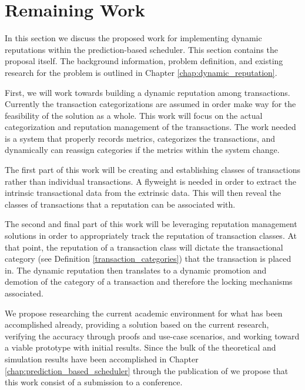 \section{Remaining Work}
\label{rep:remaining_work}

In this section we discuss the proposed work for implementing dynamic reputations within the prediction-based scheduler. This section contains the proposal itself. The background information, problem definition, and existing research for the problem is outlined in Chapter \ref{chap:dynamic_reputation}.

First, we will work towards building a dynamic reputation among transactions. Currently the transaction categorizations are assumed in order make way for the feasibility of the solution as a whole. This work will focus on the actual categorization and reputation management of the transactions. The work needed is a system that properly records metrics, categorizes the transactions, and dynamically can reassign categories if the metrics within the system change.

The first part of this work will be creating and establishing classes of transactions rather than individual transactions. A flyweight is needed in order to extract the intrinsic transactional data from the extrinsic data. This will then reveal the classes of transactions that a reputation can be associated with.

The second and final part of this work will be leveraging reputation management solutions in order to appropriately track the reputation of transaction classes. At that point, the reputation of a transaction class will dictate the transactional category (see Definition \ref{transaction_categories}) that the transaction is placed in. The dynamic reputation then translates to a dynamic promotion and demotion of the category of a transaction and therefore the locking mechanisms associated.

We propose researching the current academic environment for what has been accomplished already, providing a solution based on the current research, verifying the accuracy through proofs and use-case scenarios, and working toward a viable prototype with initial results. Since the bulk of the theoretical and simulation results have been accomplished in Chapter \ref{chap:prediction_based_scheduler} through the publication of \cite{ravan_ensuring_2020} we propose that this work consist of a submission to a conference.